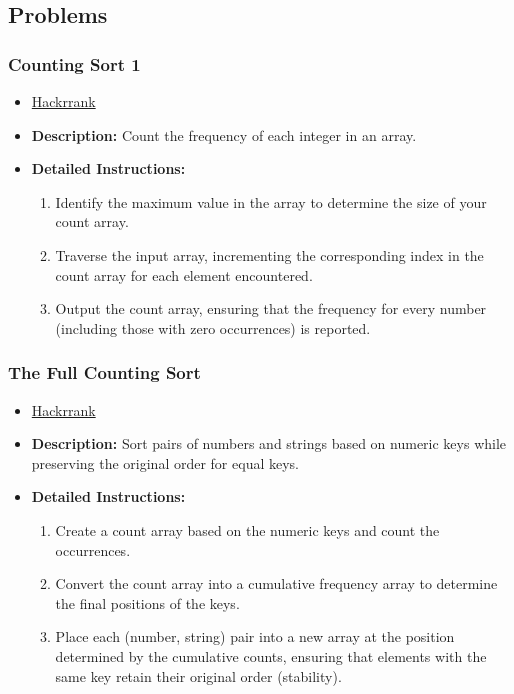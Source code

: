 \subsection{Problems}
\subsubsection{Counting Sort 1}
\begin{itemize}
    \item \href{https://www.hackerrank.com/challenges/one-week-preparation-kit-countingsort1/problem}{Hackrrank}
    \item \textbf{Description:} Count the frequency of each integer in an array.
    \item \textbf{Detailed Instructions:}
    \begin{enumerate}
        \item Identify the maximum value in the array to determine the size of your count array.
        \item Traverse the input array, incrementing the corresponding index in the count array for each element encountered.
        \item Output the count array, ensuring that the frequency for every number (including those with zero occurrences) is reported.
    \end{enumerate}
\end{itemize}

\subsubsection{The Full Counting Sort}
\begin{itemize}
    \item \href{https://www.hackerrank.com/challenges/countingsort4/problem}{Hackrrank}
    \item \textbf{Description:} Sort pairs of numbers and strings based on numeric keys while preserving the original order for equal keys.
    \item \textbf{Detailed Instructions:}
    \begin{enumerate}
        \item Create a count array based on the numeric keys and count the occurrences.
        \item Convert the count array into a cumulative frequency array to determine the final positions of the keys.
        \item Place each (number, string) pair into a new array at the position determined by the cumulative counts, ensuring that elements with the same key retain their original order (stability).
    \end{enumerate}
\end{itemize}

